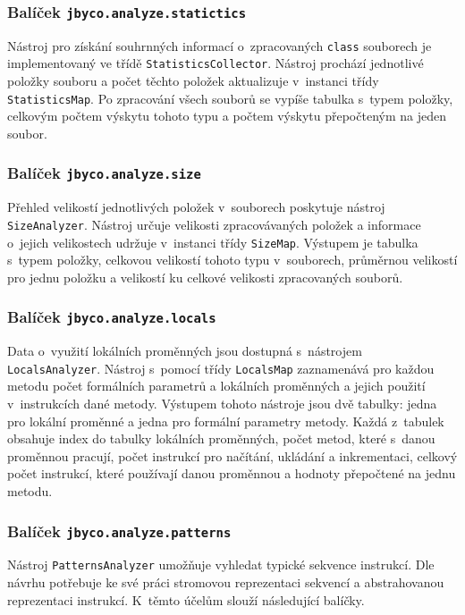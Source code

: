 \subsubsection{Balíček \texttt{jbyco.analyze.statictics}}

Nástroj pro získání souhrnných informací o~zpracovaných \texttt{class} souborech je implementovaný ve třídě \texttt{StatisticsCollector}. Nástroj prochází jednotlivé položky souboru a  počet těchto položek aktualizuje v~instanci třídy \texttt{StatisticsMap}. Po zpracování všech souborů se vypíše tabulka s~typem položky, celkovým počtem výskytu tohoto typu a počtem výskytu přepočteným na jeden soubor. 

\subsubsection{Balíček \texttt{jbyco.analyze.size}}

Přehled velikostí jednotlivých položek v~souborech poskytuje nástroj \texttt{SizeAnalyzer}. Nástroj určuje velikosti zpracovávaných položek a informace o~jejich velikostech udržuje v~instanci třídy \texttt{SizeMap}. Výstupem je tabulka s~typem položky, celkovou velikostí tohoto typu v~souborech, průměrnou velikostí pro jednu položku a velikostí ku celkové velikosti zpracovaných souborů. 

\subsubsection{Balíček \texttt{jbyco.analyze.locals}}

Data o~využití lokálních proměnných jsou dostupná s~nástrojem \texttt{LocalsAnalyzer}. Nástroj s~pomocí třídy \texttt{LocalsMap} zaznamenává pro každou metodu počet formálních parametrů a lokálních proměnných a jejich použití v~instrukcích dané metody. Výstupem tohoto nástroje jsou dvě tabulky: jedna pro lokální proměnné a jedna pro formální parametry metody. Každá z~tabulek obsahuje index do tabulky lokálních proměnných, počet metod, které s~danou proměnnou pracují, počet instrukcí pro načítání, ukládání a inkrementaci, celkový počet instrukcí, které používají danou proměnnou a hodnoty přepočtené na jednu metodu.

\subsubsection{Balíček \texttt{jbyco.analyze.patterns}}

Nástroj \texttt{PatternsAnalyzer} umožňuje vyhledat typické sekvence instrukcí. Dle návrhu potřebuje ke své práci stromovou reprezentaci sekvencí a abstrahovanou reprezentaci instrukcí. K~těmto účelům slouží následující balíčky.

